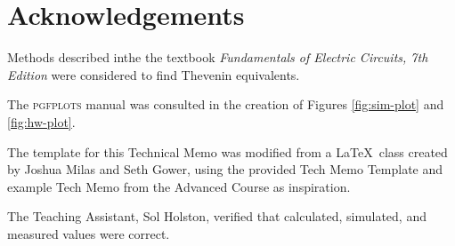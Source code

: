 \documentclass[EEEE]{KGCOEReport}
\begin{document}
\section{Acknowledgements}

Methods described inthe the textbook \textit{Fundamentals of Electric Circuits,
	7th Edition} \cite{fec} were considered to find Thevenin equivalents.

The \textsc{pgfplots} \cite{pgf} manual was consulted in the creation of
Figures \ref{fig:sim-plot} and \ref{fig:hw-plot}.

The template for this Technical Memo was modified from a \LaTeX \ class created
by Joshua Milas and Seth Gower, using the provided Tech Memo Template and
example Tech Memo from the Advanced Course as inspiration.

The Teaching Assistant, Sol Holston, verified that calculated, simulated, and
measured values were correct.

\printbibliography
\end{document}
